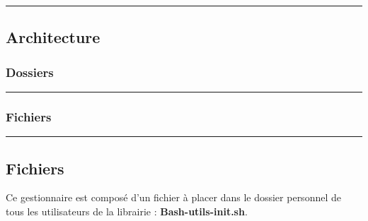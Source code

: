 \documentclass[a4paper,10pt]{article}
\begin{document}
\color{green}\par\noindent\rule{\textwidth}{0.4pt}\color{white}

\color{green}
\subsection{Architecture}\color{white}

\color{blue}
\subsubsection{Dossiers}\color{white}

\begin{justify}

\end{justify}



\color{blue}\par\noindent\rule{\textwidth}{0.4pt}\color{white}

\color{blue}
\subsubsection{Fichiers}\color{white}

\begin{justify}

\end{justify}




\color{green}\par\noindent\rule{\textwidth}{0.4pt}\color{white}

\color{green}
\subsection{Fichiers}\color{white}

\begin{justify}
    Ce gestionnaire est composé d'un fichier à placer dans le dossier personnel de tous les utilisateurs de la librairie :  \textbf{\color{lime}Bash-utils-init.sh\color{white}}.
\end{justify}
\end{document}
